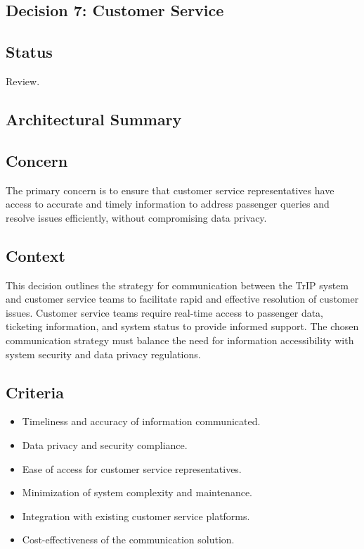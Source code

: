 \subsection{Decision 7: Customer Service}

\subsection*{Status}
Review.

\subsection*{Architectural Summary}

\subsection*{Concern}
The primary concern is to ensure that customer service representatives have access to accurate and timely information to address passenger queries and resolve issues efficiently, without compromising data privacy.

\subsection*{Context}
This decision outlines the strategy for communication between the TrIP system and customer service teams to facilitate rapid and effective resolution of customer issues. Customer service teams require real-time access to passenger data, ticketing information, and system status to provide informed support. The chosen communication strategy must balance the need for information accessibility with system security and data privacy regulations.

\subsection*{Criteria}
\begin{itemize}
    \item Timeliness and accuracy of information communicated.
    \item Data privacy and security compliance.
    \item Ease of access for customer service representatives.
    \item Minimization of system complexity and maintenance.
    \item Integration with existing customer service platforms.
    \item Cost-effectiveness of the communication solution.
\end{itemize}

